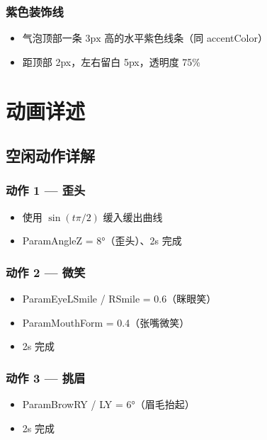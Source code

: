 \documentclass[12pt,a4paper]{ctexart}
\begin{document}
\subsubsection{紫色装饰线}
\begin{itemize}
    \item 气泡顶部一条 $3\text{px}$ 高的水平紫色线条（同 accentColor）
    \item 距顶部 2px，左右留白 5px，透明度 75\%
\end{itemize}

\section{动画详述}

\subsection{空闲动作详解}

\subsubsection{动作 1 --- 歪头}
\begin{itemize}
    \item 使用 $\sin(t\pi/2)$ 缓入缓出曲线
    \item ParamAngleZ = 8°（歪头）、2s 完成
\end{itemize}

\subsubsection{动作 2 --- 微笑}
\begin{itemize}
    \item ParamEyeLSmile / RSmile = 0.6（眯眼笑）
    \item ParamMouthForm = 0.4（张嘴微笑）
    \item 2s 完成
\end{itemize}

\subsubsection{动作 3 --- 挑眉}
\begin{itemize}
    \item ParamBrowRY / LY = 6°（眉毛抬起）
    \item 2s 完成
\end{itemize}
\end{document}
